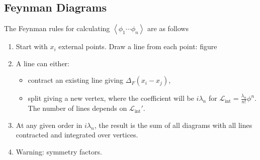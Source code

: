 \subsection{Feynman Diagrams}

The Feynman rules for calculating $\left<\phi_1 \cdots \phi_n \right>$ are as follows
\begin{enumerate}[label=\arabic*)]
    \item Start with $x_{i}$ external points. Draw a line from each point: figure
    \item A line can either:
        \begin{itemize}
            \item contract an existing line giving $\Delta_F \left( x_i - x_j \right)$,
            \item split giving a new vertex, where the coefficient will be $i \lambda_n$ for $\mathcal{L}_\text{int}= \frac{\lambda_{n}}{n!} \phi^{n}$. The number of lines depends on $\mathcal{L}_\text{int}'$.
        \end{itemize}
    \item At any given order in $i \lambda_n$, the result is the sum of all diagrams with all lines contracted and integrated over vertices.
    \item Warning: symmetry factors.
\end{enumerate}
